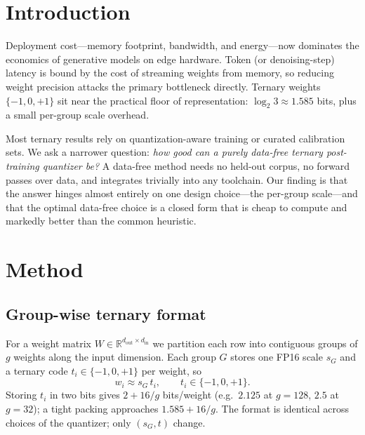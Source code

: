 \documentclass[11pt]{article}
\newcommand{\R}{\mathbb{R}}
\begin{document}
\section{Introduction}
Deployment cost---memory footprint, bandwidth, and energy---now dominates the
economics of generative models on edge hardware. Token (or denoising-step)
latency is bound by the cost of streaming weights from memory, so reducing weight
precision attacks the primary bottleneck directly. Ternary weights
$\{-1,0,+1\}$ sit near the practical floor of representation: $\log_2 3\approx
1.585$ bits, plus a small per-group scale overhead.

Most ternary results rely on quantization-aware training or curated calibration
sets. We ask a narrower question: \emph{how good can a purely data-free ternary
post-training quantizer be?} A data-free method needs no held-out corpus, no
forward passes over data, and integrates trivially into any toolchain. Our finding
is that the answer hinges almost entirely on one design choice---the per-group
scale---and that the optimal data-free choice is a closed form that is cheap to
compute and markedly better than the common heuristic.

\section{Method}

\subsection{Group-wise ternary format}
For a weight matrix $W\in\R^{d_\text{out}\times d_\text{in}}$ we partition each row
into contiguous groups of $g$ weights along the input dimension. Each group $G$
stores one FP16 scale $s_G$ and a ternary code $t_i\in\{-1,0,+1\}$ per weight, so
\begin{equation}
  w_i \approx s_G\, t_i,\qquad t_i\in\{-1,0,+1\}.
\end{equation}
Storing $t_i$ in two bits gives $2 + 16/g$ bits/weight (e.g.\ $2.125$ at $g{=}128$,
$2.5$ at $g{=}32$); a tight packing approaches $1.585 + 16/g$. The format is
identical across choices of the quantizer; only $(s_G, t)$ change.
\end{document}
